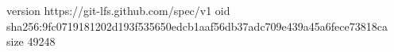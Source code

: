 version https://git-lfs.github.com/spec/v1
oid sha256:9fc0719181202d193f535650edcb1aaf56db37adc709e439a45a6fece73818ca
size 49248
